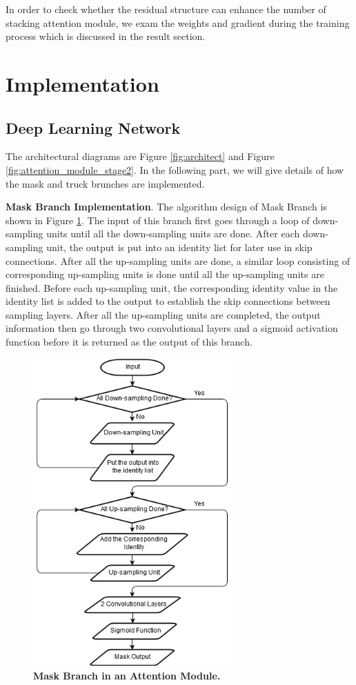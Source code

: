 \documentclass{article}
\newcommand{\mycaption}[2]{\caption[#1]{\textbf{#1.} #2}}
\begin{document}
\begin{multicols}{2}
In order to check whether the residual structure can enhance the number of stacking attention module, we exam the weights and gradient during the training process which is discussed in the result section. 





\section{Implementation}

\subsection{Deep Learning Network}
The architectural diagrams are Figure \ref{fig:architect} and Figure \ref{fig:attention_module_stage2}. In the following part, we will give details of how the mask and truck brunches are implemented. 

\textbf{Mask Branch Implementation}. The algorithm design of Mask Branch is shown in Figure \ref{fig:mask_flowchart}. The input of this branch first goes through a loop of down-sampling units until all the down-sampling units are done. After each down-sampling unit, the output is put into an identity list for later use in skip connections. After all the up-sampling units are done, a similar loop consisting of corresponding up-sampling units is done until all the up-sampling units are finished. Before each up-sampling unit, the corresponding identity value in the identity list is added to the output to establish the skip connections between sampling layers. After all the up-sampling units are completed, the output information then go through two convolutional layers and a sigmoid activation function before it is returned as the output of this branch.
\begin{figure}[H] 
\includegraphics[width=3in]{imgs/mask_flowchart.png}  
\mycaption{Mask Branch in an Attention Module}{}  
\label{fig:mask_flowchart}
\end{figure}


\end{multicols}
\end{document}
